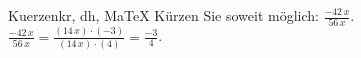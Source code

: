 \begin{MAufgabe}{Kuerzen}{kr, dh, MaTeX}
K\"urzen Sie soweit m\"oglich: $\frac{- 42\, x}{56\, x}$.\\ 
\ifLsg\MLoesung
\quad $\frac{- 42\, x}{56\, x}=\frac{(14\, x)\cdot(-3)}{(14\, x)\cdot(4)}=\frac{-3}{4}$.\else\relax\fi
 \end{MAufgabe}